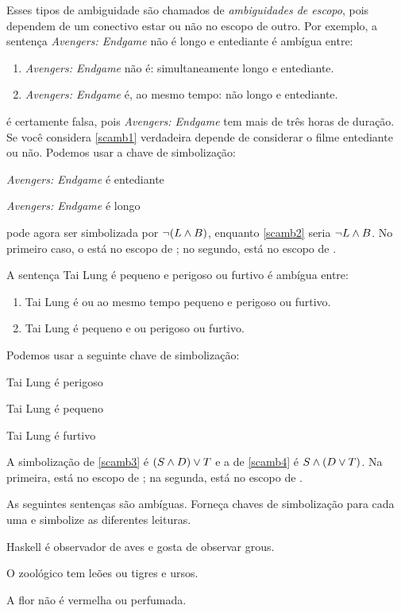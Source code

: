 Esses tipos de ambiguidade são chamados de \emph{ambiguidades de escopo},
pois dependem de um conectivo estar ou não no escopo de outro. Por
exemplo, a sentença \textit{Avengers: Endgame} não é longo e entediante é
ambígua entre:
\begin{enumerate}
	\item\label{scamb1} \textit{Avengers: Endgame} não é: simultaneamente longo e entediante.
	\item\label{scamb2} \textit{Avengers: Endgame} é, ao mesmo tempo: não longo e entediante.
\end{enumerate}
 é certamente falsa, pois \textit{Avengers: Endgame} tem
mais de três horas de duração. Se você considera \cref*{scamb1}
verdadeira depende de considerar o filme entediante ou não. Podemos usar
a chave de simbolização:
\begin{ekey}
	\item[B] \textit{Avengers: Endgame} é entediante
	\item[L] \textit{Avengers: Endgame} é longo
\end{ekey}
 pode agora ser simbolizada por $\neg(L \wedge B)$,
enquanto \cref*{scamb2} seria $\neg L \wedge B$. No primeiro caso, o
\eand está no escopo de \enot; no segundo, \enot está no escopo de
\eand.

A sentença Tai Lung é pequeno e perigoso ou furtivo é ambígua
entre:
\begin{enumerate}
	\item\label{scamb3} Tai Lung é ou ao mesmo tempo pequeno e perigoso ou furtivo.
	\item\label{scamb4} Tai Lung é pequeno e ou perigoso ou furtivo.
\end{enumerate}
Podemos usar a seguinte chave de simbolização:
\begin{ekey}
	\item[D] Tai Lung é perigoso
	\item[S] Tai Lung é pequeno
	\item[T] Tai Lung é furtivo
\end{ekey}
A simbolização de \cref*{scamb3} é $(S \wedge D) \vee T$ e a de
\cref*{scamb4} é $S \wedge (D \vee T)$. Na primeira, \eand está no escopo
de \eor; na segunda, \eor está no escopo de \eand.

\practiceproblems
\solutions
\problempart As seguintes sentenças são ambíguas. Forneça chaves de simbolização para cada uma e simbolize as diferentes leituras.
\begin{compactlist}
	\item Haskell é observador de aves e gosta de observar grous.
	\item O zoológico tem leões ou tigres e ursos.
	\item A flor não é vermelha ou perfumada.
\end{compactlist}

